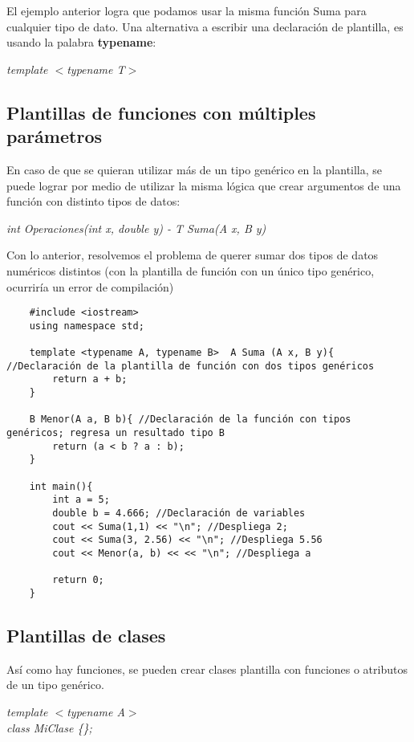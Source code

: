El ejemplo anterior logra que podamos usar la misma función Suma para cualquier tipo de dato. Una alternativa a escribir una declaración de plantilla, es usando la palabra \textbf{typename}:
\begin{center}
    \textit{template $<$typename T$>$}
\end{center}


\subsection{Plantillas de funciones con múltiples parámetros}
\hspace{0.55cm}En caso de que se quieran utilizar más de un tipo genérico en la plantilla, se puede lograr por medio de utilizar la misma lógica que crear argumentos de una función con distinto tipos de datos:
\begin{center}
    \textit{int Operaciones(int x, double y) - T Suma(A x, B y) }
\end{center}

Con lo anterior, resolvemos el problema de querer sumar dos tipos de datos numéricos distintos (con la plantilla de función con un único tipo genérico, ocurriría un error de compilación)
\begin{lstlisting}
    #include <iostream>
    using namespace std;
    
    template <typename A, typename B>  A Suma (A x, B y){ //Declaración de la plantilla de función con dos tipos genéricos
        return a + b;
    }
    
    B Menor(A a, B b){ //Declaración de la función con tipos genéricos; regresa un resultado tipo B
        return (a < b ? a : b);
    }
    
    int main(){
        int a = 5;
        double b = 4.666; //Declaración de variables
        cout << Suma(1,1) << "\n"; //Despliega 2;
        cout << Suma(3, 2.56) << "\n"; //Despliega 5.56
        cout << Menor(a, b) << << "\n"; //Despliega a
        
        return 0;
    }
\end{lstlisting}


\subsection{Plantillas de clases}
\hspace{0.55cm}Así como hay funciones, se pueden crear clases plantilla con funciones o atributos de un tipo genérico.
\begin{center}
    \textit{
        template $<$typename A$>$ \\
        class MiClase \{\};
    }
\end{center}

